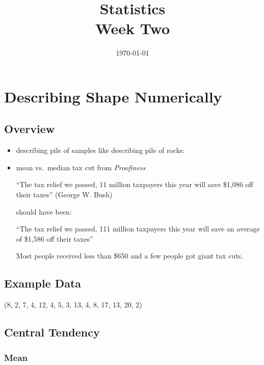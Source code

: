 \documentclass{exam}
\author{}
\date{\today}
\title{Statistics \\ Week Two}
\begin{document}
  \maketitle
  \tableofcontents

  \section{Describing Shape Numerically}

  \subsection{Overview}

  \begin{itemize}
    \item describing pile of samples like describing pile of rocks:

    \item mean vs.\ median tax cut from {\em Proofiness\/}

      ``The tax relief we passed, 11 million taxpayers this year will save \$1,086 off their taxes'' (George W. Bush)

      should have been:

      ``The tax relief we passed, 111 million taxpayers this year will save an average of \$1,586 off their taxes''

      Most people received less than \$650 and a few people got giant tax cuts. 

  \end{itemize}

  \subsection{Example Data}
  (8, 2, 7, 4, 12, 4, 5, 3, 13, 4, 8, 17, 13, 20, 2)

  \subsection{Central Tendency}

  \subsubsection{Mean}
\end{document}
